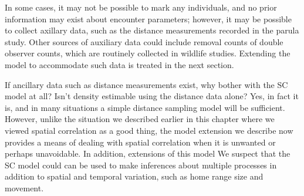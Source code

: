 In some cases, it may not be possible to mark any individuals, and no
prior information may exist about encounter parameters; however, it
may be possible to collect axillary data, such as the distance
measurements recorded in the parula study.
Other sources of auxiliary data could include removal counts of
double observer counts, which are routinely collected in
wildlife studies. Extending the model to accommodate such data is
treated in the next section.







If ancillary data such as distance measurements exist, why
bother with the SC model at all?
Isn't density estimable
using the distance data alone? Yes, in fact it is, and in many situations a
simple distance sampling model will be sufficient. However, unlike the
situation we described earlier in this chapter where we viewed spatial
correlation as a good thing, the model extension we describe now
provides a means of dealing with spatial correlation when it is
unwanted or perhaps unavoidable.
In addition, extensions of this model
We suspect that the SC model could
can be used to make inferences about multiple processes in addition to
spatial and temporal variation, such as home range size and movement.

